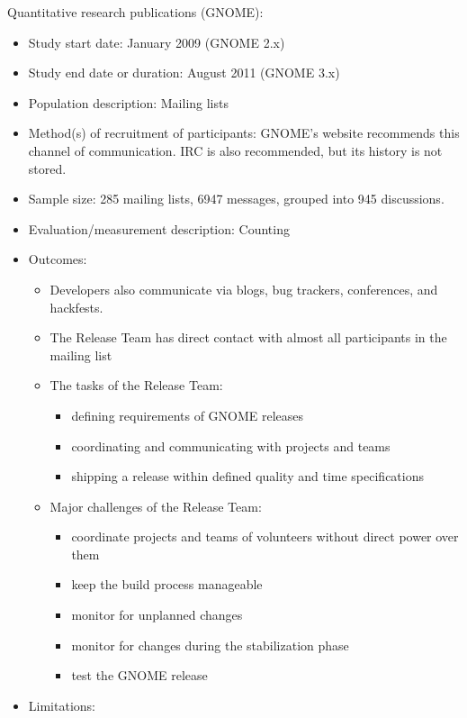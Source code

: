 \documentclass[]{book}
\providecommand{\tightlist}{%
  \setlength{\itemsep}{0pt}\setlength{\parskip}{0pt}}
\begin{document}
Quantitative research publications (GNOME):

\begin{itemize}
\tightlist
\item
  Study start date: January 2009 (GNOME 2.x)
\item
  Study end date or duration: August 2011 (GNOME 3.x)
\item
  Population description: Mailing lists
\item
  Method(s) of recruitment of participants: GNOME's website recommends
  this channel of communication. IRC is also recommended, but its
  history is not stored.
\item
  Sample size: 285 mailing lists, 6947 messages, grouped into 945
  discussions.
\item
  Evaluation/measurement description: Counting
\item
  Outcomes:

  \begin{itemize}
  \tightlist
  \item
    Developers also communicate via blogs, bug trackers, conferences,
    and hackfests.
  \item
    The Release Team has direct contact with almost all participants in
    the mailing list
  \item
    The tasks of the Release Team:

    \begin{itemize}
    \tightlist
    \item
      defining requirements of GNOME releases
    \item
      coordinating and communicating with projects and teams
    \item
      shipping a release within defined quality and time specifications
    \end{itemize}
  \item
    Major challenges of the Release Team:

    \begin{itemize}
    \tightlist
    \item
      coordinate projects and teams of volunteers without direct power
      over them
    \item
      keep the build process manageable
    \item
      monitor for unplanned changes
    \item
      monitor for changes during the stabilization phase
    \item
      test the GNOME release
    \end{itemize}
  \end{itemize}
\item
  Limitations:


\end{itemize}
\end{document}
